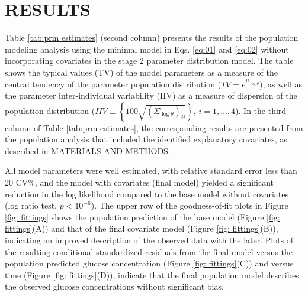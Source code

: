 \documentclass[utf8]{frontiersSCNS} %
\begin{document}
\section{RESULTS}
\vskip 0.5cm
Table \ref{tab:prm estimates} (second column) presents the results of the population modeling analysis using the minimal model in Eqs. \ref{eq:01} and \ref{eq:02} without incorporating covariates in the stage 2 parameter distribution model. The table shows the typical values (TV) of the model parameters as a measure of the central tendency of the parameter population distribution ($TV = {e^{{\mu _{\log \theta }}}}$), as well as the parameter inter-individual variability (IIV) as a measure of dispersion of the population distribution ($IIV \equiv \left\{ {100\sqrt {{{\left( {{\Sigma _{\log \theta }}} \right)}_{ii}}} } \right\},\,i = 1, \ldots ,4$). In the third column of Table \ref{tab:prm estimates}, the corresponding results are presented from the population analysis that included the identified explanatory covariates, as described in MATERIALS AND METHODS.

All model parameters were well estimated, with relative standard error less than 20 CV\%, and the model with covariates (final model) yielded a significant reduction in the log likelihood compared to the base model without covariates (log ratio test, $p<10^{-6}$). The upper row of the goodness-of-fit plots in Figure \ref{fig: fittings} shows the population prediction of the base model (Figure \ref{fig: fittings}(A)) and that of the final covariate model (Figure \ref{fig: fittings}(B)), indicating an improved description of the observed data with the later. Plots of the resulting conditional standardized residuals from the final model versus the population predicted glucose concentration (Figure \ref{fig: fittings}(C)) and versus time (Figure \ref{fig: fittings}(D)), indicate that the final population model describes the observed glucose concentrations without significant bias.
\end{document}
